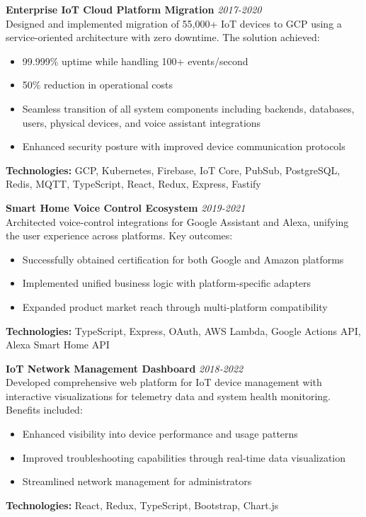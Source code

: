 \documentclass{fullstackdeveloper-ats}
\begin{document}
\noindent\textbf{Enterprise IoT Cloud Platform Migration} \hfill \textit{2017-2020}\\
Designed and implemented migration of 55,000+ IoT devices to GCP using a service-oriented architecture with zero downtime. The solution achieved:
\begin{itemize}
    \item 99.999\% uptime while handling 100+ events/second
    \item 50\% reduction in operational costs
    \item Seamless transition of all system components including backends, databases, users, physical devices, and voice assistant integrations
    \item Enhanced security posture with improved device communication protocols
\end{itemize}
\noindent\textbf{Technologies:} GCP, Kubernetes, Firebase, IoT Core, PubSub, PostgreSQL, Redis, MQTT, TypeScript, React, Redux, Express, Fastify

\vspace{0.4cm}

\noindent\textbf{Smart Home Voice Control Ecosystem} \hfill \textit{2019-2021}\\
Architected voice-control integrations for Google Assistant and Alexa, unifying the user experience across platforms. Key outcomes:
\begin{itemize}
    \item Successfully obtained certification for both Google and Amazon platforms
    \item Implemented unified business logic with platform-specific adapters
    \item Expanded product market reach through multi-platform compatibility
\end{itemize}
\noindent\textbf{Technologies:} TypeScript, Express, OAuth, AWS Lambda, Google Actions API, Alexa Smart Home API

\vspace{0.4cm}

\noindent\textbf{IoT Network Management Dashboard} \hfill \textit{2018-2022}\\
Developed comprehensive web platform for IoT device management with interactive visualizations for telemetry data and system health monitoring. Benefits included:
\begin{itemize}
    \item Enhanced visibility into device performance and usage patterns
    \item Improved troubleshooting capabilities through real-time data visualization
    \item Streamlined network management for administrators
\end{itemize}
\noindent\textbf{Technologies:} React, Redux, TypeScript, Bootstrap, Chart.js
\end{document}
